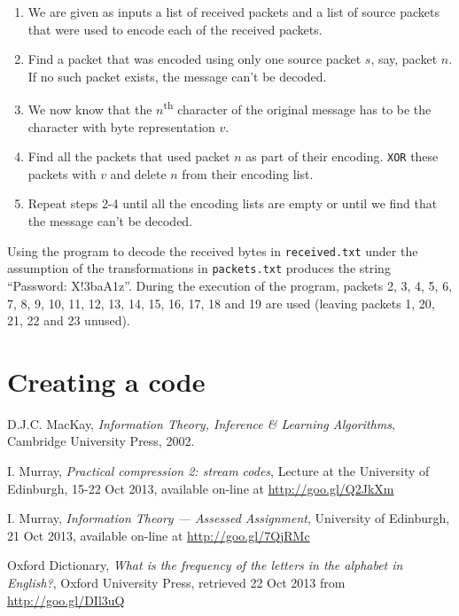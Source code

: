 \documentclass[10pt,a4paper,oneside,onecolumn]{article}
\newcommand*{\receivedTXT}{{\tt received.txt}\xspace}
\newcommand*{\packetsTXT}{{\tt packets.txt}\xspace}
\newcommand*{\XOR}{{\tt XOR}\xspace}
\begin{document}
\begin{enumerate}
\item We are given as inputs a list of received packets and a list of source
      packets that were used to encode each of the received packets.
\item Find a packet that was encoded using only one source packet $s$, say,
      packet $n$.  If no such packet exists, the message can't be decoded.
\item We now know that the $n$\textsuperscript{th} character of the original
      message has to be the character with byte representation $v$.
\item Find all the packets that used packet $n$ as part of their encoding.
      \XOR these packets with $v$ and delete $n$ from their encoding list.
\item Repeat steps 2-4 until all the encoding lists are empty or until we find
      that the message can't be decoded.
\end{enumerate}

Using the program to decode the received bytes in \receivedTXT under the
assumption of the transformations in \packetsTXT produces the string ``Password:
X!3baA1z''. During the execution of the program, packets 2, 3, 4, 5, 6, 7, 8, 9,
10, 11, 12, 13, 14, 15, 16, 17, 18 and 19 are used (leaving packets 1, 20, 21,
22 and 23 unused).


\section{Creating a code}\label{sec:ex8}


\begin{thebibliography}{9}

    D.J.C. MacKay,
    \emph{Information Theory, Inference \& Learning Algorithms},
    Cambridge University Press,
    2002.

    I. Murray,
    \emph{Practical compression 2: stream codes},
    Lecture at the University of Edinburgh,
    15-22 Oct 2013,
    available on-line at \url{http://goo.gl/Q2JkXm}

    I. Murray,
    \emph{Information Theory — Assessed Assignment},
    University of Edinburgh,
    21 Oct 2013,
    available on-line at \url{http://goo.gl/7QjRMc}

    Oxford Dictionary,
    \emph{What is the frequency of the letters in the alphabet in English?},
    Oxford University Press,
    retrieved 22 Oct 2013 from \url{http://goo.gl/DIl3uQ}

\end{thebibliography}
\end{document}
